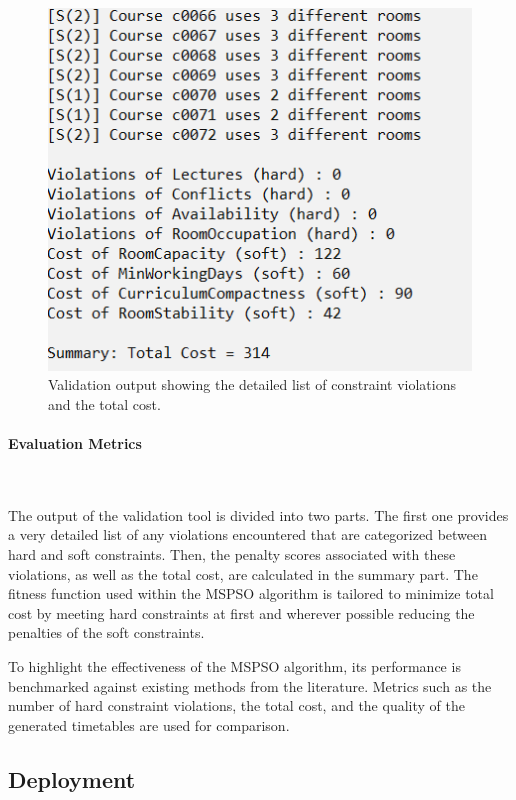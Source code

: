 \begin{figure}[H]
    \centering
    \includegraphics[width=\textwidth]{validator.png} 
    \caption{Validation output showing the detailed list of constraint violations and the total cost.}
    \label{fig:validation_output}
\end{figure}

\paragraph{Evaluation Metrics}\

The output of the validation tool is divided into two parts. The first one provides a very detailed list of any violations encountered that are categorized between hard and soft constraints. Then, the penalty scores associated with these violations, as well as the total cost, are calculated in the summary part. The fitness function used within the MSPSO algorithm is tailored to minimize total cost by meeting hard constraints at first and wherever possible reducing the penalties of the soft constraints.

To highlight the effectiveness of the MSPSO algorithm, its performance is benchmarked against existing methods from the literature. Metrics such as the number of hard constraint violations, the total cost, and the quality of the generated timetables are used for comparison. 


\subsection{Deployment}
\label{subsec:deployment}

